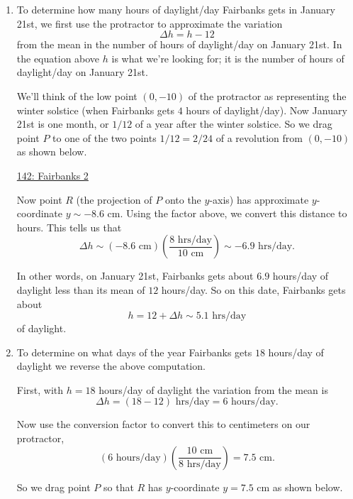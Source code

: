 \documentclass{ximera}
\begin{document}
\begin{example}
\begin{explanation}
\begin{enumerate}
\item To determine how many hours of daylight/day Fairbanks gets in January 21st, we first use the protractor to approximate the variation 
\[
    \Delta h = h - 12
\]
from the mean in the number of hours of daylight/day on January 21st. In the equation above $h$ is what we're looking for; it is the number of hours of daylight/day on January 21st.

We'll think of the low point $(0,-10)$ of the protractor as representing the winter solstice (when Fairbanks gets $4$ hours of daylight/day). Now January 21st is one month, or $1/12$ of a year after the winter solstice. So we drag point $P$ to one of the two points $1/12 = 2/24$ of a revolution from $(0,-10)$ as shown below.


\begin{onlineOnly}
    \begin{center}
\end{center}
\end{onlineOnly}

\href{https://www.desmos.com/calculator/4xsc9i7i4s}{142: Fairbanks 2}

Now point $R$ (the projection of $P$ onto the $y$-axis) has approximate $y$-coordinate $y\sim-8.6$ cm. Using the factor above, we convert this distance to hours. This tells us that
\[
  \Delta h \sim (-8.6 \text{ cm})\left( \frac{8 \text{ hrs/day}}{10 \text{ cm}} \right) \sim -6.9\text{ hrs/day}.
\] 

In other words, on January 21st, Fairbanks gets about $6.9$ hours/day of daylight less than its mean of $12$ hours/day. So on this date, Fairbanks gets about
\[
   h = 12  + \Delta h \sim 5.1 \text{ hrs/day} 
\]
of daylight.

\item To determine on what days of the year Fairbanks gets $18$ hours/day of daylight we reverse the above computation. 

First, with $h=18$ hours/day of daylight the variation from the mean is
\[
  \Delta h = (18-12)\text{ hrs/day} = 6 \text{ hours/day} .
\]

Now use the conversion factor to convert this to centimeters on our protractor, 
\[
       (6 \text{ hours/day}) \left( \frac{10 \text{ cm}}{8 \text{ hrs/day}} \right) = 7.5\text{ cm}. 
\]

So we drag point $P$ so that $R$ has $y$-coordinate $y=7.5$ cm as shown below.

\begin{onlineOnly}
    \begin{center}
\end{center}
\end{onlineOnly}


\end{enumerate}
\end{explanation}
\end{example}
\end{document}
